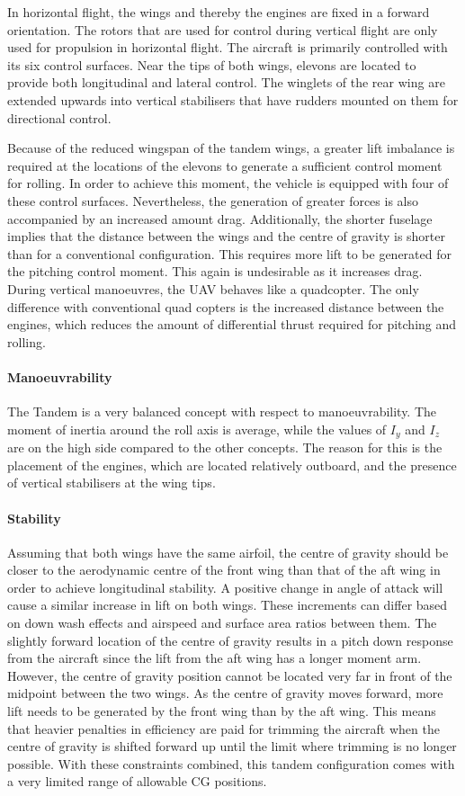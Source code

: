 In horizontal flight, the wings and thereby the engines are fixed in a forward orientation. The rotors that are used for control during vertical flight are only used for propulsion in horizontal flight. The aircraft is primarily controlled with its six control surfaces. Near the tips of both wings, elevons are located to provide both longitudinal and lateral control. The winglets of the rear wing are extended upwards into vertical stabilisers that have rudders mounted on them for directional control.

Because of the reduced wingspan of the tandem wings, a greater lift imbalance is required at the locations of the elevons to generate a sufficient control moment for rolling. In order to achieve this moment, the vehicle is equipped with four of these control surfaces. Nevertheless, the generation of greater forces is also accompanied by an increased amount drag. Additionally, the shorter fuselage implies that the distance between the wings and the centre of gravity is shorter than for a conventional configuration. This requires more lift to be generated for the pitching control moment. This again is undesirable as it increases drag. During vertical manoeuvres, the UAV behaves like a quadcopter. The only difference with conventional quad copters is the increased distance between the engines, which reduces the amount of differential thrust required for pitching and rolling.

\paragraph{Manoeuvrability}
The Tandem is a very balanced concept with respect to manoeuvrability. The moment of inertia around the roll axis is average, while the values of $I_y$ and $I_z$ are on the high side compared to the other concepts. The reason for this is the placement of the engines, which are located relatively outboard, and the presence of vertical stabilisers at the wing tips.

\paragraph{Stability}
Assuming that both wings have the same airfoil, the centre of gravity should be closer to the aerodynamic centre of the front wing than that of the aft wing in order to achieve longitudinal stability. A positive change in angle of attack will cause a similar increase in lift on both wings. These increments can differ based on down wash effects and airspeed and surface area ratios between them. The slightly forward location of the centre of gravity results in a pitch down response from the aircraft since the lift from the aft wing has a longer moment arm. However, the centre of gravity position cannot be located very far in front of the midpoint between the two wings. As the centre of gravity moves forward, more lift needs to be generated by the front wing than by the aft wing. This means that heavier penalties in efficiency are paid for trimming the aircraft when the centre of gravity is shifted forward up until the limit where trimming is no longer possible. With these constraints combined, this tandem configuration comes with a very limited range of allowable CG positions. 


